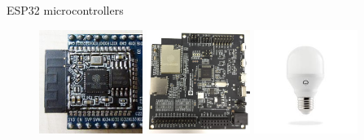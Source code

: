 \documentclass[10pt]{beamer}
\begin{document}
\begin{frame}{ESP32 microcontrollers}
\begin{figure}
\centering
\includegraphics[width=0.3\textwidth]{esp32_photo.jpg}
\hfill
\includegraphics[width=0.3\textwidth]{esp32_wrover.jpg}
\hfill
\includegraphics[width=0.3\textwidth]{lightbulb.jpg}
\end{figure}
\end{frame}
\end{document}
